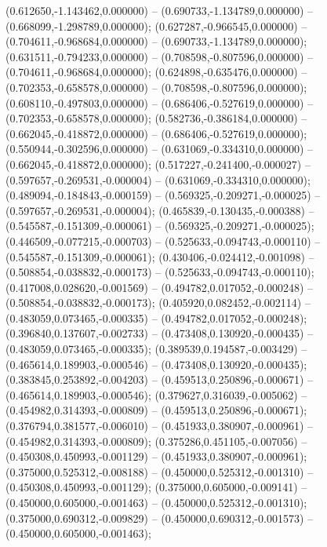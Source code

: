  (0.612650,-1.143462,0.000000) -- (0.690733,-1.134789,0.000000) -- (0.668099,-1.298789,0.000000);
 (0.627287,-0.966545,0.000000) -- (0.704611,-0.968684,0.000000) -- (0.690733,-1.134789,0.000000);
 (0.631511,-0.794233,0.000000) -- (0.708598,-0.807596,0.000000) -- (0.704611,-0.968684,0.000000);
 (0.624898,-0.635476,0.000000) -- (0.702353,-0.658578,0.000000) -- (0.708598,-0.807596,0.000000);
 (0.608110,-0.497803,0.000000) -- (0.686406,-0.527619,0.000000) -- (0.702353,-0.658578,0.000000);
 (0.582736,-0.386184,0.000000) -- (0.662045,-0.418872,0.000000) -- (0.686406,-0.527619,0.000000);
 (0.550944,-0.302596,0.000000) -- (0.631069,-0.334310,0.000000) -- (0.662045,-0.418872,0.000000);
 (0.517227,-0.241400,-0.000027) -- (0.597657,-0.269531,-0.000004) -- (0.631069,-0.334310,0.000000);
 (0.489094,-0.184843,-0.000159) -- (0.569325,-0.209271,-0.000025) -- (0.597657,-0.269531,-0.000004);
 (0.465839,-0.130435,-0.000388) -- (0.545587,-0.151309,-0.000061) -- (0.569325,-0.209271,-0.000025);
 (0.446509,-0.077215,-0.000703) -- (0.525633,-0.094743,-0.000110) -- (0.545587,-0.151309,-0.000061);
 (0.430406,-0.024412,-0.001098) -- (0.508854,-0.038832,-0.000173) -- (0.525633,-0.094743,-0.000110);
 (0.417008,0.028620,-0.001569) -- (0.494782,0.017052,-0.000248) -- (0.508854,-0.038832,-0.000173);
 (0.405920,0.082452,-0.002114) -- (0.483059,0.073465,-0.000335) -- (0.494782,0.017052,-0.000248);
 (0.396840,0.137607,-0.002733) -- (0.473408,0.130920,-0.000435) -- (0.483059,0.073465,-0.000335);
 (0.389539,0.194587,-0.003429) -- (0.465614,0.189903,-0.000546) -- (0.473408,0.130920,-0.000435);
 (0.383845,0.253892,-0.004203) -- (0.459513,0.250896,-0.000671) -- (0.465614,0.189903,-0.000546);
 (0.379627,0.316039,-0.005062) -- (0.454982,0.314393,-0.000809) -- (0.459513,0.250896,-0.000671);
 (0.376794,0.381577,-0.006010) -- (0.451933,0.380907,-0.000961) -- (0.454982,0.314393,-0.000809);
 (0.375286,0.451105,-0.007056) -- (0.450308,0.450993,-0.001129) -- (0.451933,0.380907,-0.000961);
 (0.375000,0.525312,-0.008188) -- (0.450000,0.525312,-0.001310) -- (0.450308,0.450993,-0.001129);
 (0.375000,0.605000,-0.009141) -- (0.450000,0.605000,-0.001463) -- (0.450000,0.525312,-0.001310);
 (0.375000,0.690312,-0.009829) -- (0.450000,0.690312,-0.001573) -- (0.450000,0.605000,-0.001463);
